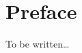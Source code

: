 
\chapter*{Preface}


To be written\ldots

 
\noindent\textsw{\myLocation, \myTime}


\begin{flushright}
        \Large{\calligra\myName} 
\end{flushright}

